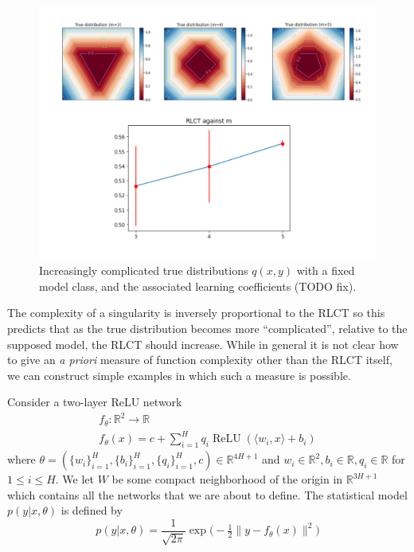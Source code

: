 \documentclass{article} %
\begin{document}
\begin{figure}[h]
\begin{center}
\includegraphics[scale=0.3]{RLCT_m.pdf}
\end{center}
\caption{Increasingly complicated true distributions $q(x,y)$ with a fixed model class, and the associated learning coefficients (TODO fix).}
\label{figure:simp_func_complex}
\end{figure}

The complexity of a singularity is inversely proportional to the RLCT so this predicts that as the true distribution becomes more ``complicated'', relative to the supposed model, the RLCT should increase. While in general it is not clear how to give an \emph{a priori} measure of function complexity other than the RLCT itself, we can construct simple examples in which such a measure is possible.

Consider a two-layer ReLU network
\begin{gather*}
f_\theta: \mathbb{R}^2 \longrightarrow \mathbb{R}\\
f_\theta(x) = c + \sum_{i=1}^H q_i \operatorname{ReLU}( \langle w_i, x \rangle + b_i )
\end{gather*}
where $\theta = (\{w_i\}_{i=1}^H, \{b_i\}_{i=1}^H, \{q_i\}_{i=1}^H, c) \in \mathbb{R}^{4H+1}$ and $w_i \in \mathbb{R}^2, b_i \in \mathbb{R}, q_i \in \mathbb{R}$ for $1 \le i \le H$. We let $W$ be some compact neighborhood of the origin in $\mathbb{R}^{3H+1}$ which contains all the networks that we are about to define. The statistical model $p(y|x,\theta)$ is defined by
\begin{equation}
p(y|x, \theta) = \frac{1}{\sqrt{2\pi}} \exp\Big( -\tfrac{1}{2} \| y - f_\theta(x) \|^2 \Big)
\end{equation}
\end{document}

